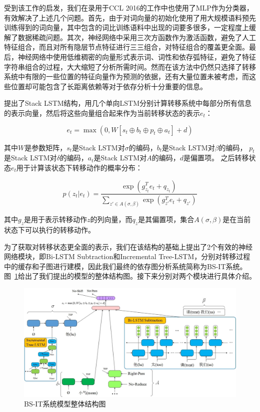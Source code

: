 受到该工作的启发，我们在录用于CCL 2016的工作中也使用了MLP作为分类器，有效解决了上述几个问题。首先，由于对词向量的初始化使用了用大规模语料预先训练得到的词向量，其中包含的词比训练语料中出现的词要多很多，一定程度上缓解了数据稀疏问题。其次，神经网络中采用三次方函数作为激活函数，避免了人工特征组合，而且对所有隐层节点特征进行三三组合，对特征组合的覆盖更全面。最后，神经网络中使用低维稠密的向量形式表示词、词性和依存弧特征，避免了特征字符串组合的过程，大大缩短了分析所需时间。然而在该方法中仍然只选择了转移系统中有限的一些位置的特征向量作为预测的依据，还有大量位置未被考虑，而这些位置却可能包含了长距离依赖等对于依存分析十分重要的信息。

提出了Stack LSTM结构，用几个单向LSTM分别计算转移系统中每部分所有信息的表示向量，然后将这些向量组合起来作为当前转移状态的表示$e_t$：

\vspace{-0.6em}
\begin{equation}
e_t=\max(0,W[s_t\oplus b_t \oplus p_t \oplus a_t ]+d)
\end{equation}

其中$W$是参数矩阵，$s_t$是Stack LSTM对$\sigma$的编码，$b_t$是Stack LSTM对$\beta$的编码， $p_t$是Stack LSTM对$\delta$的编码，$a_t$是Stack LSTM对$A$的编码，$d$是偏置项。
之后转移状态$e_t$用于计算该状态下转移动作的概率分布：

\vspace{-0.6em}
\begin{equation}
p(z_t|e_t)=\frac{\exp(g^T_{z_t}e_t + q_{z_t})}{\sum_{z'\in A(\sigma, \beta)}\exp (g^T_{z'}e_t+q_{z'})}
\end{equation}

其中$g_z$是用于表示转移动作$z$的列向量，而$q_z$是其偏置项，集合$A(\sigma,\beta)$是在当前状态下可以执行的转移动作。

为了获取对转移状态更全面的表示，我们在该结构的基础上提出了2个有效的神经网络模块，即Bi-LSTM Subtraction和Incremental Tree-LSTM，分别对转移过程中的缓存和子图进行建模，因此我们最终的依存图分析系统简称为BS-IT系统。图~\ref{fig:bsit}给出了我们提出的模型的整体结构图。接下来分别对两个模块进行具体介绍。

\begin{figure}[hbtp]
	\centering
	\includegraphics[width=130mm]{picture/bsit.jpg}
	\caption{BS-IT系统模型整体结构图}
	\label{fig:bsit}
\end{figure}

